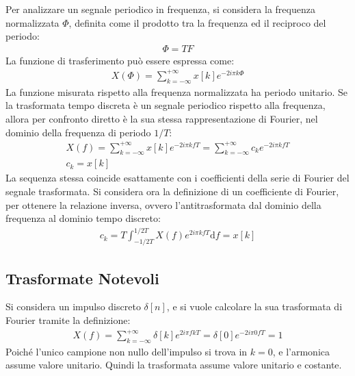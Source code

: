 \documentclass{article}
\newcommand{\df}{\mathrm{d}}
\numberwithin{equation}{subsection}
\begin{document}
Per analizzare un segnale periodico in frequenza, si considera la frequenza normalizzata $\Phi$, definita come il prodotto tra la frequenza ed il reciproco del periodo:
\begin{gather*}
    \Phi=TF
\end{gather*}
La funzione di trasferimento può essere espressa come:
\begin{gather*}
    X(\Phi)=\displaystyle\sum_{k=-\infty}^{+\infty}x[k]e^{-2i\pi k\Phi}
\end{gather*}
La funzione misurata rispetto alla frequenza normalizzata ha periodo unitario. 
Se la trasformata tempo discreta è un segnale periodico rispetto alla frequenza, allora per confronto diretto è la sua stessa rappresentazione di Fourier, nel dominio della 
frequenza di periodo $1/T$:
\begin{gather*}
    X(f)=\displaystyle\sum_{k=-\infty}^{+\infty}x[k]e^{-2i\pi kfT}=\sum_{k=-\infty}^{+\infty}c_ke^{-2i\pi kfT}\\
    c_k=x[k]
\end{gather*}
La sequenza stessa coincide esattamente con i coefficienti della serie di Fourier del segnale trasformata. Si considera ora la definizione di un coefficiente di Fourier, 
per ottenere la relazione inversa, ovvero l'antitrasformata dal dominio della frequenza al dominio tempo discreto:
\begin{gather*}
    c_k=\displaystyle T\int_{-1/2T}^{1/2T}X(f)e^{2i\pi kfT}\df f=x[k]
\end{gather*}

\subsection{Trasformate Notevoli}

Si considera un impulso discreto $\delta[n]$, e si vuole calcolare la sua trasformata di Fourier tramite la definizione:
\begin{gather*}
    X(f)=\displaystyle\sum_{k=-\infty}^{+\infty}\delta[k]e^{2i\pi fkT}=\delta[0]e^{-2i\pi 0fT}=1
\end{gather*}
Poiché l'unico campione non nullo dell'impulso si trova in $k=0$, e l'armonica assume valore unitario. Quindi la trasformata assume valore unitario e costante. 
\end{document}

